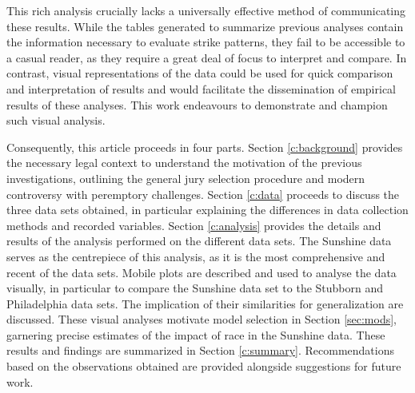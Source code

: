 This rich analysis crucially lacks a universally effective method of communicating these results. While the
tables generated to summarize previous analyses contain
the information necessary to evaluate strike patterns, they fail
to be accessible to a casual reader, as they require a great deal of focus to interpret and compare. In contrast, visual
representations of the data could be used for quick
comparison and interpretation of results and would facilitate the dissemination of
empirical results of these analyses. This work endeavours to
demonstrate and champion such visual analysis.

Consequently, this article proceeds in four parts. Section \ref{c:background} provides the necessary legal context to understand the
motivation of the previous investigations, outlining the general jury
selection procedure and modern controversy with peremptory challenges. Section \ref{c:data} proceeds to discuss the three data sets obtained, in particular explaining the differences in data collection methods and recorded variables. Section \ref{c:analysis} provides the details and results
of the analysis performed on the different data sets. The Sunshine data serves as the centrepiece of this analysis, as it is the most comprehensive and recent of the data sets. Mobile plots are described and used to analyse the data visually, in particular to compare the Sunshine data set to the Stubborn and Philadelphia data sets. The implication of their similarities for generalization are discussed. These visual analyses motivate
model selection in Section \ref{sec:mods}, garnering precise estimates of the impact of race in the Sunshine data. These results and
findings are summarized in Section \ref{c:summary}. Recommendations based on the observations obtained are provided alongside suggestions for future work.
